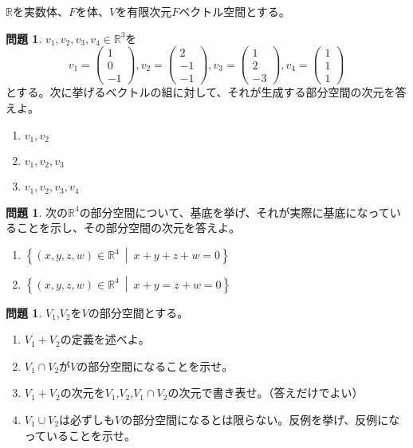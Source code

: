 \documentclass[uplatex]{jsarticle}
\theoremstyle{definition}
\numberwithin{equation}{section}
\newtheorem{prob}[section]{問題}
\newcommand{\midbar}{\ \middle| \ }
\newcommand{\R}{\mathbb{R}}
\begin{document}
$\R$を実数体、$F$を体、$V$を有限次元$F$ベクトル空間とする。
\begin{prob}
  $v_1,v_2,v_3,v_4\in \R^3$を
  \[
    v_1 = \begin{pmatrix}
      1 \\ 0 \\ -1
    \end{pmatrix}
    , v_2 = \begin{pmatrix}
      2 \\ -1 \\ -1
    \end{pmatrix}
    , v_3 = \begin{pmatrix}
      1 \\ 2 \\ -3
    \end{pmatrix}
    , v_4 = \begin{pmatrix}
      1 \\ 1 \\ 1
    \end{pmatrix}
  \]
  とする。次に挙げるベクトルの組に対して、それが生成する部分空間の次元を答えよ。
  \begin{enumerate}
    \item $v_1,v_2$
    \item $v_1,v_2,v_3$
    \item $v_1,v_2,v_3,v_4$
  \end{enumerate}
\end{prob}

\begin{prob}
  次の$\R^4$の部分空間について、基底を挙げ、それが実際に基底になっていることを示し、その部分空間の次元を答えよ。
  \begin{enumerate}
    \item $\left\{ (x,y,z,w)\in\R^4 \midbar x+y+z+w=0 \right\}$
    \item $\left\{ (x,y,z,w)\in\R^4 \midbar x+y=z+w=0 \right\}$
  \end{enumerate}
\end{prob}

\begin{prob}
  $V_1$,$V_2$を$V$の部分空間とする。
  \begin{enumerate}
    \item $V_1+V_2$の定義を述べよ。
    \item $V_1\cap V_2$が$V$の部分空間になることを示せ。
    \item $V_1+V_2$の次元を$V_1$,$V_2$,$V_1\cap V_2$の次元で書き表せ。（答えだけでよい）
    \item $V_1\cup V_2$は必ずしも$V$の部分空間になるとは限らない。反例を挙げ、反例になっていることを示せ。
  \end{enumerate}
\end{prob}
\end{document}
